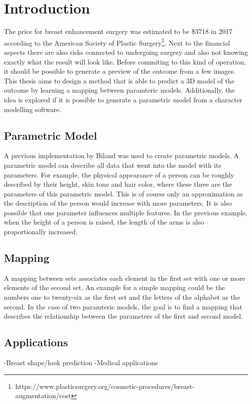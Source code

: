\setcounter{chapter}{0}

\chapter{Introduction}

The price for breast enhancement surgery was estimated to be \$3718 in 2017 according to the American Society of Plastic Surgery\footnote{https://www.plasticsurgery.org/cosmetic-procedures/breast-augmentation/cost}. Next to the financial aspects there are also risks connected to undergoing surgery and also not knowing exactly what the result will look like. Before commiting to this kind of operation, it should be possible to generate a preview of the outcome from a few images. This thesis aims to design a method that is able to predict a 3D model of the outcome by learning a mapping between paramteric models. Additionally, the idea is explored if it is possible to generate a parametric model from a character modelling software.




\section{Parametric Model}
A previous implementation by Biland \cite{Biland17} was used to create parametric models. A parametric model can describe all data that went into the model with its parameters. For example, the physical appearance of a person can be roughly described by their height, skin tone and hair color, where these three are the parameters of this parametric model. This is of course only an approximation as the description of the person would increase with more parameters. It is also possible that one parameter influences multiple features. In the previous example, when the height of a person is raised, the length of the arms is also proportionally increased.

\section{Mapping}
A mapping between sets associates each element in the first set with one or more elements of the second set. An example for a simple mapping could be the numbers one to twenty-six as the first set and the letters of the alphabet as the second. In the case of two paramteric models, the goal is to find a mapping that describes the relationship between the parameters of the first and second model. %

\section{Applications}
-Breast shape/look prediction
-Medical applications
